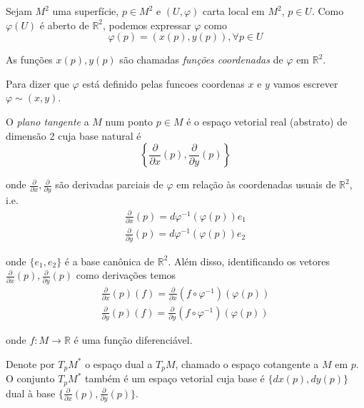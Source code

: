 Sejam $M^2$ uma superfície, $p \in M^2$ e $(U, \varphi)$ carta local em $M^2$, $p \in U$. Como $\varphi(U)$ é aberto de $\mathbb{R}^2$, podemos expressar $\varphi$ como
\begin{equation*}
	\varphi(p) = (x(p), y(p)), \forall p \in U
\end{equation*}

As funções $x(p), y(p)$ são chamadas \emph{funções coordenadas} de $\varphi$ em $\mathbb{R}^2$.

\begin{nota}
	Para dizer que $\varphi$ está definido pelas funcoes coordenas $x$ e $y$ vamos escrever $\varphi \sim  (x,y)$.
\end{nota}

\begin{defi}
	O \emph{plano tangente} a $M$ num ponto $p \in M$ é o espaço vetorial real (abstrato) de dimensão 2 cuja base natural é
	\begin{equation*}
		\left\{ \frac{\partial}{\partial x} (p), \frac{\partial}{\partial y} (p) \right\}
	\end{equation*}
	
	onde $\frac{\partial}{\partial x}, \frac{\partial}{\partial y}$ são derivadas parciais de $\varphi$ em relação às coordenadas usuais de $\mathbb{R}^2$, i.e.
	\begin{align*}
		\frac{\partial}{\partial x} (p) = d \varphi^{-1} ( \varphi(p) ) e_1\\
		\frac{\partial}{\partial y} (p) = d \varphi^{-1} ( \varphi(p) ) e_2
	\end{align*}
	
	onde $\{ e_1,e_2 \}$ é a base canônica de $\mathbb{R}^2$. Além disso, identificando os vetores $\frac{\partial}{\partial x} (p), \frac{\partial}{\partial y} (p)$ como derivações temos
	\begin{align*}
		\frac{\partial}{\partial x} (p) (f) = \frac{\partial}{\partial x} \left( f \circ \varphi^{-1} \right) (\varphi(p))\\
		\frac{\partial}{\partial y} (p) (f) = \frac{\partial}{\partial y} \left( f \circ \varphi^{-1} \right) (\varphi(p))
	\end{align*}
	
	onde $f: M \rightarrow \mathbb{R}$ é uma função diferenciável.
\end{defi}

\begin{obse}
	Denote por $T_p M^*$ o espaço dual a $T_p M$, chamado o espaço cotangente a $M$ em $p$. O conjunto $T_p M^*$ também é um espaço vetorial cuja base é $\{ dx(p), dy(p)  \}$ dual à base $\{ \frac{\partial}{\partial x}(p), \frac{\partial}{\partial y}(p) \}$.
\end{obse}

